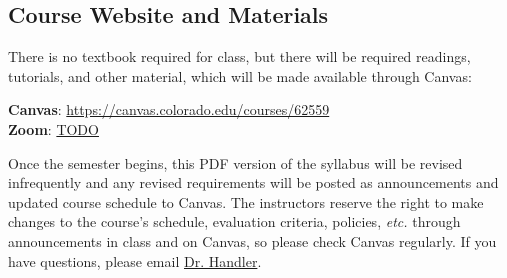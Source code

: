 \documentclass[10pt]{memoir}
\makeatletter
\def\myzoomurl{TODO}
\def\mycanvasurl{https://canvas.colorado.edu/courses/62559}
\def\instructorAlastname{Handler}
\def\instructorAemail{abram.handler@colorado.edu}
\makeatother
\begin{document}
\subsection{Course Website and Materials}
There is no textbook required for class, but there will be required readings, tutorials, and other material, which will be made available through Canvas:
\vspace{-8pt}
    \begin{center}
    \Large{\textbf{Canvas}: \href{\mycanvasurl}{\mycanvasurl}}\\
    \Large{\textbf{Zoom}: \href{\myzoomurl}{\myzoomurl}}
    \end{center}
\vspace{-8pt}
Once the semester begins, this PDF version of the syllabus will be revised infrequently and any revised requirements will be posted as announcements and updated course schedule to Canvas. The instructors reserve the right to make changes to the course's schedule, evaluation criteria, policies, \textit{etc.} through announcements in class and on Canvas, so please check Canvas regularly. If you have questions, please email \href{mailto:\instructorAemail}{Dr. \instructorAlastname}.

\end{document}
